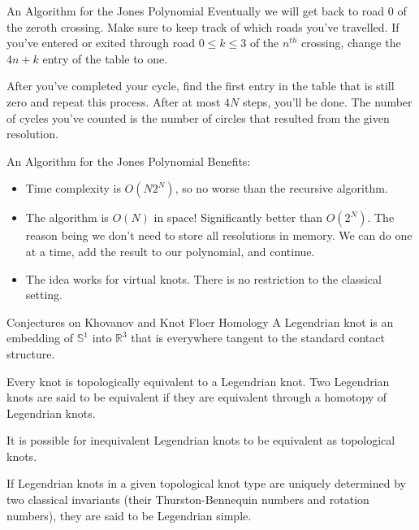 \documentclass{beamer}
\begin{document}
    \begin{frame}{An Algorithm for the Jones Polynomial}
        Eventually we will get back to road 0 of the zeroth crossing.
        Make sure to keep track of which roads you've travelled. If you've
        entered or exited through road $0\leq{k}\leq{3}$ of the $n^{th}$
        crossing, change the $4n+k$ entry of the table to one.
        \par\hfill\par
        After you've completed your cycle, find the first entry in the table
        that is still zero and repeat this process. After at most $4N$ steps,
        you'll be done. The number of cycles you've counted is the number of
        circles that resulted from the given resolution.
    \end{frame}
    \begin{frame}{An Algorithm for the Jones Polynomial}
        Benefits:
        \begin{itemize}
            \item Time complexity is $O(N2^{N})$, so no worse than the
                  recursive algorithm.
            \item The algorithm is $O(N)$ in space! Significantly better than
                  $O(2^{N})$. The reason being we don't need to store all
                  resolutions in memory. We can do one at a time, add the
                  result to our polynomial, and continue.
            \item The idea works for virtual knots. There is no restriction to
                  the classical setting.
        \end{itemize}
    \end{frame}
    \begin{frame}{Conjectures on Khovanov and Knot Floer Homology}
        A Legendrian knot is an embedding of $\mathbb{S}^{1}$ into
        $\mathbb{R}^{3}$ that is everywhere tangent to the standard
        contact structure.
        \par\hfill\par
        Every knot is topologically equivalent to a Legendrian knot. Two
        Legendrian knots are said to be equivalent if they are equivalent
        through a homotopy of Legendrian knots.
        \par\hfill\par
        It is possible for inequivalent
        Legendrian knots to be equivalent as topological knots.
        \par\hfill\par
        If Legendrian knots in a given topological knot type are uniquely
        determined by two classical invariants (their Thurston-Bennequin
        numbers and rotation numbers), they are said to be Legendrian simple.
    \end{frame}
\end{document}
